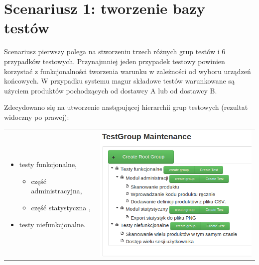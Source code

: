 \section{Scenariusz 1: tworzenie bazy testów}
Scenariusz pierwszy polega na stworzeniu trzech różnych grup testów i 6 przypadków testowych. Przynajmniej jeden przypadek testowy powinien korzystać z funkcjonalności tworzenia warunku w zależności od wyboru urządzeń końcowych. W przypadku systemu magur składowe testów warunkowane są użyciem produktów pochodzących od dostawcy A lub od dostawcy B.

Zdecydowano się na utworzenie następującej hierarchii grup testowych (rezultat widoczny po prawej):


\begin{tabular}{l l}
\begin{minipage}{0.5\textwidth}
\begin{itemize}
    \item testy funkcjonalne,
    \begin{itemize}
      \item część administracyjna,
      \item część statystyczna  ,    
    \end{itemize}
    \item testy niefunkcjonalne.
  \end{itemize}
\end{minipage}
&
\begin{minipage}{0.5\textwidth}
              \includegraphics[width=\linewidth]{img/screen/listaTestow.png}            
          
\end{minipage}

\end{tabular}


